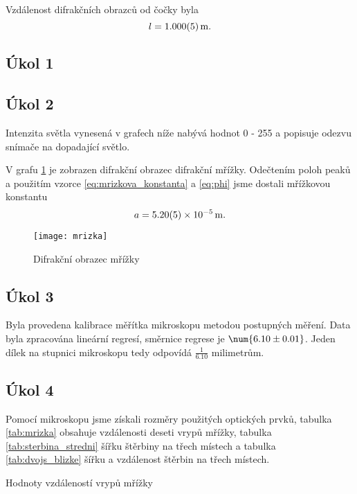 \documentclass{protokol}
\begin{document}
    Vzdálenost difrakčních obrazců od čočky byla 
    $$ l = \SI{1.000 \pm 0.005}{m}. $$

    \subsection*{Úkol 1}

    \subsection*{Úkol 2}

      Intenzita světla vynesená v grafech níže nabývá hodnot 0 - 255 a popisuje odezvu snímače na dopadající světlo.

      V grafu \ref{fig:mrizka} je zobrazen difrakční obrazec difrakční mřížky. Odečtením poloh peaků a použitím vzorce \eqref{eq:mrizkova_konstanta} a \eqref{eq:phi} jsme dostali mřížkovou konstantu 
      $$ a = \SI{5.20 \pm 0.05 e-5}{m}. $$

      \begin{figure}[H]
        \centering
        \texttt{[image: mrizka]} 
        \caption{Difrakční obrazec mřížky}
        \label{fig:mrizka}
      \end{figure}

    \subsection*{Úkol 3}

      Byla provedena kalibrace měřítka mikroskopu metodou postupných měření. Data byla zpracována lineární regresí, směrnice regrese je $\num{6.10 \pm 0.01}$. Jeden dílek na stupnici mikroskopu tedy odpovídá $\frac{1}{\num{6.10}}$ milimetrům.

    \subsection*{Úkol 4}

      Pomocí mikroskopu jsme získali rozměry použitých optických prvků, tabulka \ref{tab:mrizka} obsahuje vzdálenosti deseti vrypů mřížky, tabulka \ref{tab:sterbina_stredni} šířku štěrbiny na třech místech a tabulka \ref{tab:dvojs_blizke} šířku a vzdálenost štěrbin na třech místech.

      \begin{table}[H]
        \centering
        \setlength{\tabcolsep}{10pt}
        
        \caption{Hodnoty vzdáleností vrypů mřížky}
        \label{tab:mrizka}
      \end{table}
\end{document}

